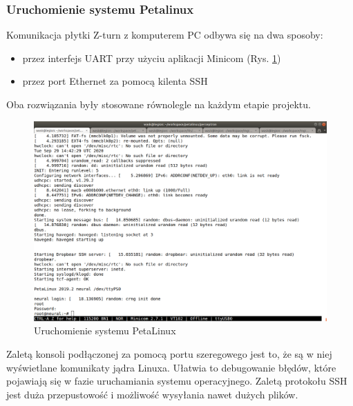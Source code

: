 \subsubsection{Uruchomienie systemu Petalinux}

Komunikacja płytki Z-turn z komputerem PC odbywa się na dwa sposoby:
\begin{itemize}
  \item przez interfejs UART przy użyciu aplikacji Minicom (Rys. \ref{petalinux-boot})
  \item przez port Ethernet za pomocą kilenta SSH 
\end{itemize}
Oba rozwiązania były stosowane równolegle na każdym etapie projektu. 

\begin{figure}[!h]
  \centering
  \includegraphics[width=\textwidth]{img/petalinux-boot.png}
  \caption{Uruchomienie systemu PetaLinux}
  \label{petalinux-boot}
\end{figure}

Zaletą konsoli podłączonej za pomocą portu szeregowego jest to, że są w niej wyświetlane komunikaty jądra Linuxa. Ułatwia to debugowanie błędów, które pojawiają się w fazie uruchamiania systemu operacyjnego. Zaletą protokołu SSH jest duża przepustowość i możliwość wysyłania nawet dużych plików.


